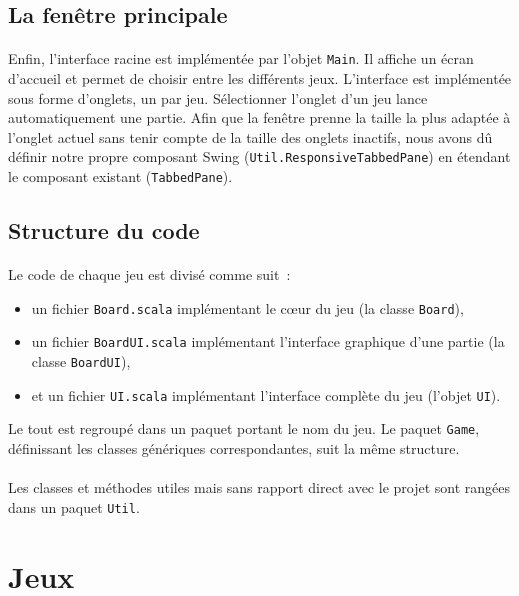 \documentclass[a4paper]{article}
\newcommand\ttt\texttt
\begin{document}
	\subsection{La fenêtre principale}

	\paragraph{}
	Enfin, l’interface racine est implémentée par l’objet \ttt{Main}. Il affiche
	un écran d’accueil et permet de choisir entre les différents jeux.
	L’interface est implémentée sous forme d’onglets, un par jeu. Sélectionner
	l’onglet d’un jeu lance automatiquement une partie. Afin que la fenêtre
	prenne la taille la plus adaptée à l’onglet actuel sans tenir compte de la
	taille des onglets inactifs, nous avons dû définir notre propre composant
	Swing (\ttt{Util.ResponsiveTabbedPane}) en étendant le composant existant
	(\ttt{TabbedPane}).

	\subsection{Structure du code}

	\paragraph{}
	Le code de chaque jeu est divisé comme suit~:
	\begin{itemize}
		\item un fichier \ttt{Board.scala} implémentant le cœur du jeu (la
			classe \ttt{Board}),
		\item un fichier \ttt{BoardUI.scala} implémentant l’interface graphique
			d’une partie (la classe \ttt{BoardUI}),
		\item et un fichier \ttt{UI.scala} implémentant l’interface complète du
			jeu (l’objet \ttt{UI}).
	\end{itemize}
	Le tout est regroupé dans un paquet portant le nom du jeu. Le paquet
	\ttt{Game}, définissant les classes génériques correspondantes, suit la même
	structure.

	\paragraph{}
	Les classes et méthodes utiles mais sans rapport direct avec le projet sont
	rangées dans un paquet \ttt{Util}.

\section{Jeux}
\end{document}

